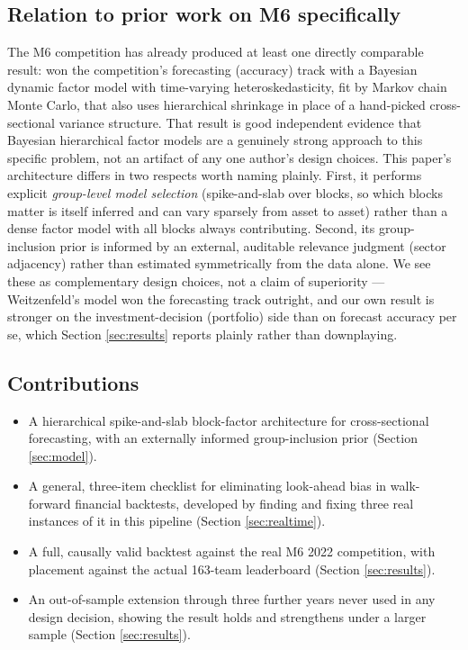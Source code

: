 \documentclass[11pt]{article}
\begin{document}
\subsection*{Relation to prior work on M6 specifically}
The M6 competition has already produced at least one directly comparable
result: \citet{weitzenfeld2025} won the competition's forecasting
(accuracy) track with a Bayesian dynamic factor model with time-varying
heteroskedasticity, fit by Markov chain Monte Carlo, that also uses
hierarchical shrinkage in place of a hand-picked cross-sectional variance
structure. That result is good independent evidence that Bayesian
hierarchical factor models are a genuinely strong approach to this
specific problem, not an artifact of any one author's design choices.
This paper's architecture differs in two respects worth naming plainly.
First, it performs explicit \emph{group-level model selection}
(spike-and-slab over blocks, so which blocks matter is itself inferred
and can vary sparsely from asset to asset) rather than a dense factor
model with all blocks always contributing. Second, its group-inclusion
prior is informed by an external, auditable relevance judgment (sector
adjacency) rather than estimated symmetrically from the data alone. We
see these as complementary design choices, not a claim of superiority ---
Weitzenfeld's model won the forecasting track outright, and our own
result is stronger on the investment-decision (portfolio) side than on
forecast accuracy per se, which Section \ref{sec:results} reports plainly
rather than downplaying.

\subsection*{Contributions}
\begin{itemize}[leftmargin=1.4em,itemsep=1pt]
  \item A hierarchical spike-and-slab block-factor architecture for
  cross-sectional forecasting, with an externally informed group-inclusion
  prior (Section \ref{sec:model}).
  \item A general, three-item checklist for eliminating look-ahead bias in
  walk-forward financial backtests, developed by finding and fixing three
  real instances of it in this pipeline (Section \ref{sec:realtime}).
  \item A full, causally valid backtest against the real M6 2022
  competition, with placement against the actual 163-team leaderboard
  (Section \ref{sec:results}).
  \item An out-of-sample extension through three further years never used
  in any design decision, showing the result holds and strengthens under
  a larger sample (Section \ref{sec:results}).
\end{itemize}
\end{document}
